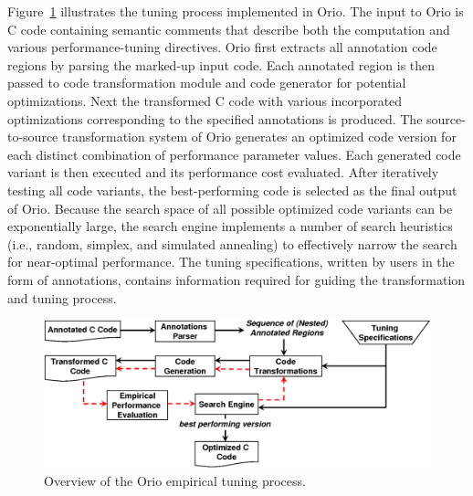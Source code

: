\documentclass[runningheads]{llncs}
\begin{document}
Figure~\ref{fig:orio} illustrates the tuning process implemented in
Orio. The input to Orio is C code containing semantic comments that
describe both the computation and various performance-tuning
directives. Orio first extracts all annotation code regions by parsing
the marked-up input code. Each annotated region is then passed to code
transformation module and code generator for potential optimizations. Next the
transformed C code with various incorporated optimizations
corresponding to the specified annotations is produced. The
source-to-source transformation system of Orio generates an optimized
code version for each distinct combination of performance parameter
values. Each generated code variant is then executed and its
performance cost evaluated. After iteratively testing all code
variants, the best-performing code is selected as the final output of
Orio. Because the search space of all possible optimized code variants
can be exponentially large, the search engine implements a number of
search heuristics (i.e., random, simplex, and simulated annealing) to
effectively narrow the search for near-optimal performance. The tuning
specifications, written by users in the form of annotations, contains
information required for guiding the transformation and tuning
process.

\begin{figure}[tb]
\begin{center}
\includegraphics[width=.65\textwidth]{figures/orio.png}
\end{center}
\vspace{-.2in}
\caption{Overview of the Orio empirical tuning process.}
\label{fig:orio}
\vspace{-.2in}
\end{figure}

\end{document}
